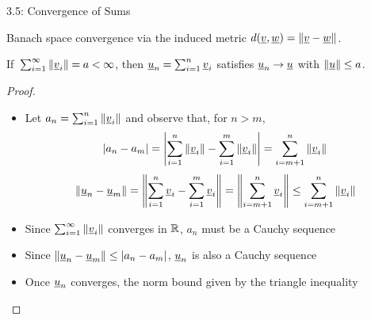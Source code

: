 \documentclass[10pt,english,aspectratio=169,handout]{beamer}
\begin{document}
\begin{frame}{3.5: Convergence of Sums}


Banach space convergence via the induced metric $d(\underline{v}, \underline{w}) = \| \underline{v}-\underline{w} \|$.

\newcommand{\vtp}{\hspace{-0.02em}}
\begin{lemma}
If $\,\sum_{i=1}^\infty \| \vecnot{v}_i \| \vtp = \vtp a \vtp <\vtp \infty$, then $\vecnot{u}_n \vtp = \vtp \sum_{i=1}^n \vecnot{v}_i$ satisfies $\vecnot{u}_n \vtp \to \vtp \vecnot{u}$ with $\| \vecnot{u} \| \vtp \leq \vtp a$.
\end{lemma}
\vspace{-0.5mm}

\begin{proof}
\begin{itemize}
\item Let $a_n = \sum_{i=1}^n \| \underline{v}_i \|$ and observe that, for $n\!>\!m$, \vspace{-2mm}
\[ |a_n - a_m| = \left| \sum_{i=1}^n \| \underline{v}_i \| - \sum_{i=1}^m \| \underline{v}_i \|  \right| = \sum_{i=m+1}^n \| \underline{v}_i \| \] 
\vspace{-2mm}
\[ \|\underline{u}_n - \underline{u}_m \| = \left\| \sum_{i=1}^n \underline{v}_i - \sum_{i=1}^m \underline{v}_i  \right\| = \left\| \sum_{i=m+1}^n \underline{v}_i \right\| \leq \sum_{i=m+1}^n \| \underline{v}_i \| \] 

\item Since $\sum_{i=1}^\infty \| \underline{v}_i \|$ converges in $\mathbb{R}$, $a_n$ must be a Cauchy sequence \vspace{1mm}

\item Since $\|\underline{u}_n - \underline{u}_m\| \leq |a_n - a_m|$, $\underline{u}_n$ is also a Cauchy sequence \vspace{1mm}

\item Once $\underline{u}_n$ converges, the norm bound given by the triangle inequality \hfill \qedhere

\end{itemize}

\end{proof}

\end{frame}
\end{document}
